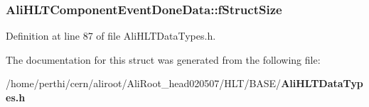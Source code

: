 \subsubsection{ {\bf Ali\-HLTComponent\-Event\-Done\-Data::f\-Struct\-Size}}\label{structAliHLTComponentEventDoneData_o0}




Definition at line 87 of file Ali\-HLTData\-Types.h.

The documentation for this struct was generated from the following file:\begin{CompactItemize}
\item 
/home/perthi/cern/aliroot/Ali\-Root\_\-head020507/HLT/BASE/{\bf Ali\-HLTData\-Types.h}\end{CompactItemize}
